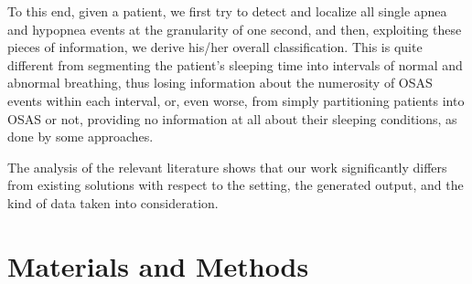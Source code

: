 \documentclass[5p,twocolumn,lefttitle]{elsarticle}
\begin{document}
To this end, given a patient, we first try to detect and localize all single apnea and hypopnea events at the granularity of one second, and then, exploiting these pieces of information, we derive his/her overall classification. This is quite different from segmenting the patient's sleeping time into intervals of normal and abnormal breathing, thus losing information about the numerosity of OSAS events within each interval, or, even worse, from simply partitioning patients into OSAS or not, providing no information at all about their sleeping conditions, as done by some approaches. 

The analysis of the relevant literature shows that our work significantly differs from existing solutions with respect to the setting, the generated output, and the kind of data taken into consideration.




\section{Materials and Methods}
\label{sec:matmeth}
\end{document}
